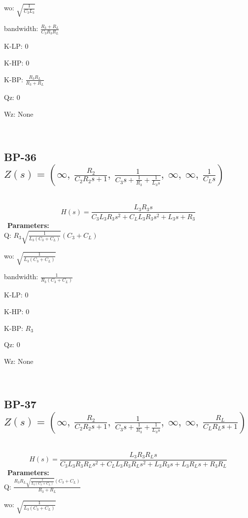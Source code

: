 \documentclass{article}
\begin{document}
wo: $\sqrt{\frac{1}{C_{3} L_{3}}}$\ 

bandwidth: $\frac{R_{3} + R_{L}}{C_{3} R_{3} R_{L}}$\ 

K-LP: $0$\ 

K-HP: $0$\ 

K-BP: $\frac{R_{3} R_{L}}{R_{3} + R_{L}}$\ 

Qz: $0$\ 

Wz: $\text{None}$\ 

\ 

\subsection{BP-36 $Z(s) = \left( \infty, \  \frac{R_{2}}{C_{2} R_{2} s + 1}, \  \frac{1}{C_{3} s + \frac{1}{R_{3}} + \frac{1}{L_{3} s}}, \  \infty, \  \infty, \  \frac{1}{C_{L} s}\right)$ } \ 
\textbf{\[H(s) = \frac{L_{3} R_{3} s}{C_{3} L_{3} R_{3} s^{2} + C_{L} L_{3} R_{3} s^{2} + L_{3} s + R_{3}}\] } \ 
\textbf{Parameters:}\\ 

Q: $R_{3} \sqrt{\frac{1}{L_{3} \left(C_{3} + C_{L}\right)}} \left(C_{3} + C_{L}\right)$\ 

wo: $\sqrt{\frac{1}{L_{3} \left(C_{3} + C_{L}\right)}}$\ 

bandwidth: $\frac{1}{R_{3} \left(C_{3} + C_{L}\right)}$\ 

K-LP: $0$\ 

K-HP: $0$\ 

K-BP: $R_{3}$\ 

Qz: $0$\ 

Wz: $\text{None}$\ 

\ 

\subsection{BP-37 $Z(s) = \left( \infty, \  \frac{R_{2}}{C_{2} R_{2} s + 1}, \  \frac{1}{C_{3} s + \frac{1}{R_{3}} + \frac{1}{L_{3} s}}, \  \infty, \  \infty, \  \frac{R_{L}}{C_{L} R_{L} s + 1}\right)$ } \ 
\textbf{\[H(s) = \frac{L_{3} R_{3} R_{L} s}{C_{3} L_{3} R_{3} R_{L} s^{2} + C_{L} L_{3} R_{3} R_{L} s^{2} + L_{3} R_{3} s + L_{3} R_{L} s + R_{3} R_{L}}\] } \ 
\textbf{Parameters:}\\ 

Q: $\frac{R_{3} R_{L} \sqrt{\frac{1}{L_{3} \left(C_{3} + C_{L}\right)}} \left(C_{3} + C_{L}\right)}{R_{3} + R_{L}}$\ 

wo: $\sqrt{\frac{1}{L_{3} \left(C_{3} + C_{L}\right)}}$\ 
\end{document}
